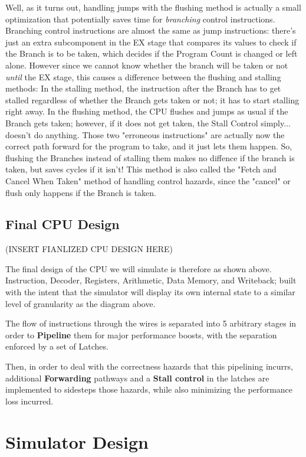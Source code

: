 \documentclass[12pt,twoside]{reedthesis}
\begin{document}
Well, as it turns out, handling jumps  with the flushing method is actually a small optimization that potentially saves time for \textit{branching} control instructions. Branching control instructions are almost the same as jump instructions: there's just an extra subcomponent in the EX stage that compares its values to check if the Branch is to be taken, which decides if the Program Count is changed or left alone. However since we cannot know whether the branch will be taken or not \textit{until} the EX stage, this causes a difference between the flushing and stalling methods: In the stalling method, the instruction after the Branch has to get stalled regardless of whether the Branch gets taken or not; it has to start stalling right away. In the flushing method, the CPU flushes and jumps as usual if the Branch gets taken; however, if it does not get taken, the Stall Control simply... doesn't do anything. Those two "erroneous instructions" are actually now the correct path forward for the program to take, and it just lets them happen. So, flushing the Branches instead of stalling them makes no diffence if the branch is taken, but saves cycles if it isn't! This method is also called the "Fetch and Cancel When Taken" method of handling control hazards, since the "cancel" or flush only happens if the Branch is taken.

\subsection{Final CPU Design}

(INSERT FIANLIZED CPU DESIGN HERE)

The final design of the CPU we will simulate is therefore as shown above. Instruction, Decoder, Registers, Arithmetic, Data Memory, and Writeback; built with the intent that the simulator will display its own internal state to a similar level of granularity as the diagram above.

The flow of instructions through the wires is separated into 5 arbitrary stages in order to \textbf{Pipeline} them for major performance boosts, with the separation enforced by a set of Latches.

Then, in order to deal with the correctness hazards that this pipelining incurrs, additional \textbf{Forwarding} pathways and a \textbf{Stall control} in the latches are implemented to sidesteps those hazards, while also minimizing the performance loss incurred.

\section{Simulator Design}
\end{document}
